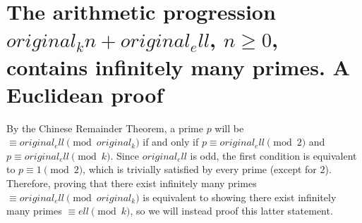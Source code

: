 \section{The arithmetic progression ${original_k}n+{original_ell}$, $n\geqslant0$, contains infinitely many primes. A Euclidean proof}

By the Chinese Remainder Theorem, a prime $p$ will be $\equiv{original_ell}\pmod{{original_k}}$ if and only if $p\equiv{original_ell}\pmod{2}$ and $p\equiv{original_ell}\pmod{{k}}$. Since ${original_ell}$ is odd, the first condition is equivalent to $p\equiv 1\pmod{2}$, which is trivially satisfied by every prime (except for $2$). Therefore, proving that there exist infinitely many primes $\equiv{original_ell}\pmod{{original_k}}$ is equivalent to showing there exist infinitely many primes $\equiv {ell}\pmod{{k}}$, so we will instead proof this latter statement.
